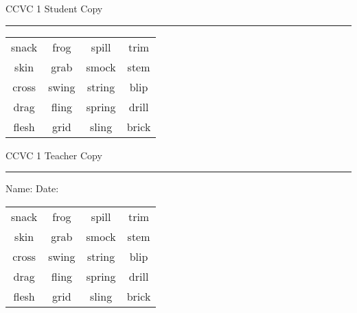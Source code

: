 \documentclass{memoir}
\begin{document}

\footnotesize \noindent
CCVC 1 \hfill Student Copy
\smallskip
\hrule

\Large

\setlength{\tabcolsep}{14pt}
\def\arraystretch{3}

{\selectfont


\begin{vplace}[0.5]
\begin{center}
\begin{tabular}{cccc}
snack & frog & spill & trim \\
skin & grab                    & smock & stem \\
cross & swing & string & blip \\
drag        & fling & spring & drill \\
flesh             & grid & sling & brick       \\
\end{tabular}
\end{center}
\end{vplace}

}

\newpage

\footnotesize \noindent
CCVC 1 \hfill Teacher Copy
\smallskip
\hrule

\normalsize

\vfill

\noindent
Name: \underline{\hspace{1.75in}} \hfill Date: \underline{\hspace{1in}}

\Large

{\selectfont


\begin{vplace}[0.5]
\begin{center}
\begin{tabular}{cccc}
snack & frog & spill & trim \\
skin & grab                    & smock & stem \\
cross & swing & string & blip \\
drag        & fling & spring & drill \\
flesh             & grid & sling & brick       \\
\end{tabular}
\end{center}
\end{vplace}



}
\end{document}
